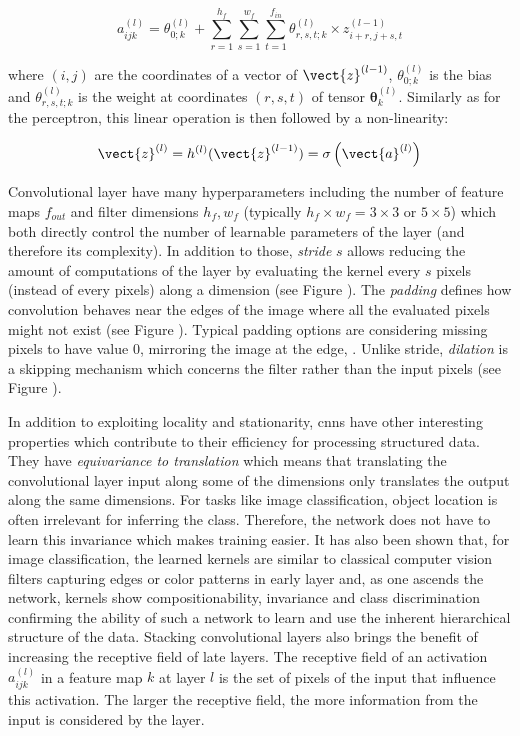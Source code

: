 \begin{equation}
\label{eqn:backml:convnet}
a^{(l)}_{ijk} = \theta^{(l)}_{0;k} + \sum_{r=1}^{h_f} \sum_{s=1}^{w_f} \sum_{t=1}^{f_{in}} \theta^{(l)}_{r,s,t;k} \times z^{(l-1)}_{i+r,j+s,t}
\end{equation}

where $(i, j)$ are the coordinates of a vector of $\vect{z}^{(l-1)}$, $\theta^{(l)}_{0;k}$ is the bias and $\theta^{(l)}_{r,s,t;k}$ is the weight at coordinates $(r,s,t)$ of tensor $\pmb{\theta}^{(l)}_k$. Similarly as for the perceptron, this linear operation is then followed by a non-linearity:

\begin{equation}
\label{eqn:backml:convnetwithactiv}
\vect{z}^{(l)} = h^{(l)}(\vect{z}^{(l-1)}) = \sigma\left(\vect{a}^{(l)}\right)
\end{equation}


Convolutional layer have many hyperparameters including the number of feature maps $f_{out}$ and filter dimensions $h_f, w_f$ (typically $h_f \times w_f = 3 \times 3$ or $5 \times 5$) which both directly control the number of learnable parameters of the layer (and therefore its complexity). In addition to those, \textit{stride} $s$ allows reducing the amount of computations of the layer by evaluating the kernel every $s$ pixels (instead of every pixels) along a dimension (see Figure ). The \textit{padding} defines how convolution behaves near the edges of the image where all the evaluated pixels might not exist (see Figure ). Typical padding options are considering missing pixels to have value 0, mirroring the image at the edge, \etc. Unlike stride, \textit{dilation} is a skipping mechanism which concerns the filter rather than the input pixels (see Figure ). 

In addition to exploiting locality and stationarity, \acrshort{cnn}s have other interesting properties which contribute to their efficiency for processing structured data. They have \textit{equivariance to translation} which means that translating the convolutional layer input along some of the dimensions only translates the output along the same dimensions. For tasks like image classification, object location is often irrelevant for inferring the class. Therefore, the network does not have to learn this invariance which makes training easier. It has also been shown that, for image classification, the learned kernels are similar to classical computer vision filters capturing edges or color patterns in early layer and, as one ascends the network, kernels show compositionability, invariance and class discrimination \parencite{zeiler2014visualizing} confirming the ability of such a network to learn and use the inherent hierarchical structure of the data. Stacking convolutional layers also brings the benefit of increasing the receptive field of late layers. The receptive field of an activation $a^{(l)}_{ijk}$ in a feature map $k$ at layer $l$ is the set of pixels of the input that influence this activation. The larger the receptive field, the more information from the input is considered by the layer. 

